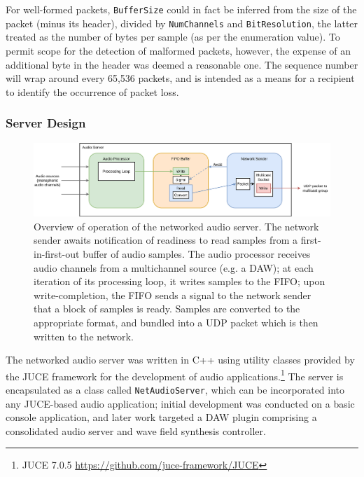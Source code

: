 For well-formed packets, \texttt{BufferSize} could in fact
be inferred from the size of the packet (minus its header), divided by
\texttt{NumChannels} and \texttt{BitResolution}, the latter
treated as the number of bytes per sample (as per the enumeration value).
To permit scope for the detection of malformed packets, however, the expense
of an additional byte in the header was deemed a reasonable one.
The sequence number will wrap around every 65,536 packets, and is intended as
a means for a recipient to identify the occurrence of packet loss.

\subsubsection{Server Design}

\begin{figure}[ht]
    \centering
    \includegraphics[width=\textwidth]{figures/audio-server}
    \caption{Overview of operation of the networked audio server.
    The network sender awaits notification of readiness to read samples from a
    first-in-first-out buffer of audio samples.
    The audio processor receives audio channels from a multichannel source
        (e.g. a DAW); at each iteration of its processing loop, it writes samples
        to the FIFO; upon write-completion, the FIFO sends a signal to the network
        sender that a block of samples is ready.
        Samples are converted to the appropriate format, and bundled into a UDP
        packet which is then written to the network.}
    \label{fig:audio-server}
\end{figure}

The networked audio server was written in C++ using utility classes provided by
the JUCE framework for the development of audio applications.\footnote{
    JUCE 7.0.5 \url{https://github.com/juce-framework/JUCE}
}
The server is encapsulated as a class called \texttt{NetAudioServer},
which can be incorporated into any JUCE-based audio application;
initial development was conducted on a basic console application, and later work
targeted a DAW plugin comprising a consolidated audio server and wave field
synthesis controller.

